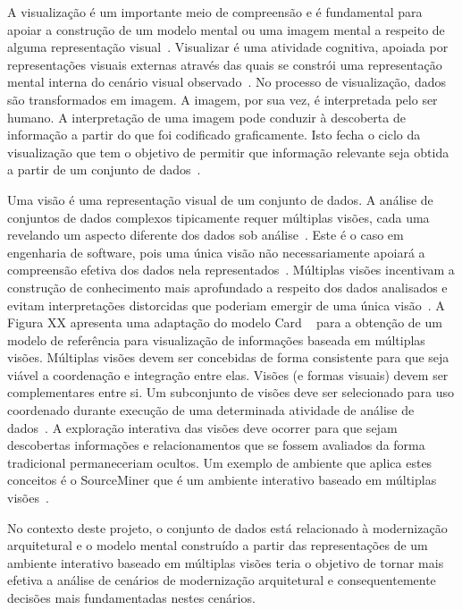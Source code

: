 \documentclass[12pt]{article}
\begin{document}
A visualização é um importante meio de compreensão e é fundamental para apoiar a construção de um modelo mental ou uma imagem mental a respeito de alguma representação visual~\cite{spence2014information}. Visualizar é uma atividade cognitiva, apoiada por representações visuais externas através das quais se constrói uma representação mental interna do cenário visual observado~\cite{spence2014information, ware2012information}. No processo de visualização, dados são transformados em imagem. A imagem, por sua vez, é interpretada pelo ser humano. A interpretação de uma imagem pode conduzir à descoberta de informação a partir do que foi codificado graficamente. Isto fecha o ciclo da visualização que tem o objetivo de permitir que informação relevante seja obtida a partir de um conjunto de dados~\cite{source_miner_glauco}. 

Uma visão é uma representação visual de um conjunto de dados. A análise de conjuntos de dados complexos tipicamente requer múltiplas visões, cada uma revelando um aspecto diferente dos dados sob análise~\cite{Boukhelifa_2003}. Este é o caso em engenharia de software, pois uma única visão não necessariamente apoiará a compreensão efetiva dos dados nela representados~\cite{Storey_2006}. Múltiplas visões incentivam a construção de conhecimento mais aprofundado a respeito dos dados analisados e evitam interpretações distorcidas que poderiam emergir de uma única visão~\cite{Ainsworth_1999}. A Figura XX apresenta uma adaptação do modelo Card ~\cite{source_miner_glauco} para a obtenção de um modelo de referência para visualização de informações baseada em múltiplas visões. Múltiplas visões devem ser concebidas de forma consistente para que seja viável a coordenação e integração entre elas. Visões (e formas visuais) devem ser complementares entre si. Um subconjunto de visões deve ser selecionado para uso coordenado durante execução de uma determinada atividade de análise de dados~\cite{WangBaldonado_2000}. A exploração interativa das visões deve ocorrer para que sejam descobertas informações e relacionamentos que se fossem avaliados da forma tradicional permaneceriam ocultos. Um exemplo de ambiente que aplica estes conceitos é o SourceMiner que é um ambiente interativo baseado em múltiplas visões~\cite{source_miner_glauco}. 

No contexto deste projeto, o conjunto de dados está relacionado à modernização arquitetural e o modelo mental construído a partir das representações de um ambiente interativo baseado em múltiplas visões teria o objetivo de tornar mais efetiva a análise de cenários de modernização arquitetural e consequentemente decisões mais fundamentadas nestes cenários. 
\end{document}
